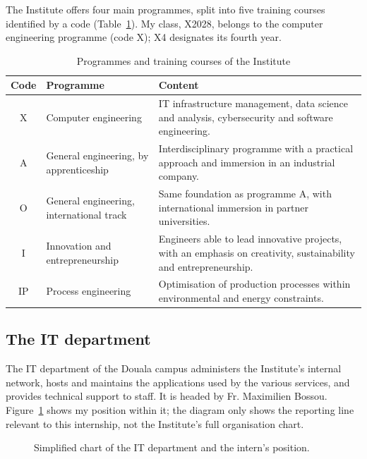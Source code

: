 The Institute offers four main programmes, split into five training courses identified by a code (Table~\ref{tab:filieres}). My class, X2028, belongs to the computer engineering programme (code X); X4 designates its fourth year.

\begin{table}[h]
\centering
\renewcommand{\arraystretch}{1.15}
\begin{tabularx}{\textwidth}{|c|p{3.3cm}|X|}
\hline
\rowcolor{ucacred!15} \textbf{Code} & \textbf{Programme} & \textbf{Content} \\
\hline
X & Computer engineering & IT infrastructure management, data science and analysis, cybersecurity and software engineering. \\
\hline
A & General engineering, by apprenticeship & Interdisciplinary programme with a practical approach and immersion in an industrial company. \\
\hline
O & General engineering, international track & Same foundation as programme A, with international immersion in partner universities. \\
\hline
I & Innovation and entrepreneurship & Engineers able to lead innovative projects, with an emphasis on creativity, sustainability and entrepreneurship. \\
\hline
IP & Process engineering & Optimisation of production processes within environmental and energy constraints. \\
\hline
\end{tabularx}
\caption{Programmes and training courses of the Institute}
\label{tab:filieres}
\end{table}

\subsection{The IT department}
The IT department of the Douala campus administers the Institute's internal network, hosts and maintains the applications used by the various services, and provides technical support to staff. It is headed by Fr. Maximilien Bossou. Figure~\ref{fig:organigramme} shows my position within it; the diagram only shows the reporting line relevant to this internship, not the Institute's full organisation chart.

\begin{figure}[h]
\centering
{}
\caption{Simplified chart of the IT department and the intern's position.}
\label{fig:organigramme}
\end{figure}

